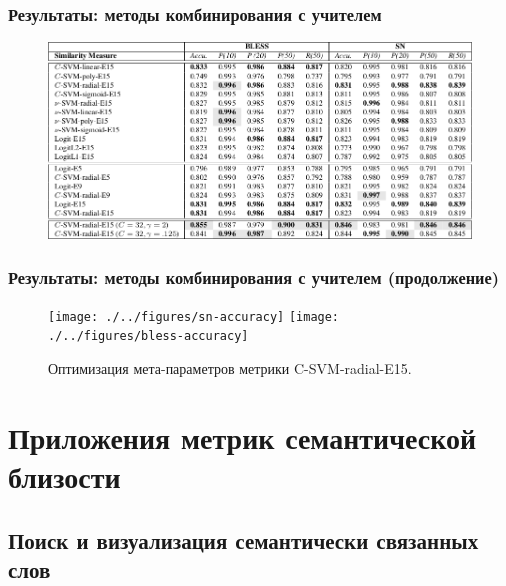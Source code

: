 \begin{frame}
\frametitle{Результаты: методы комбинирования с учителем}

    \begin{figure}
    \centering
        \includegraphics[width=1.0\textwidth]{figures/hybrid-table}
        
\end{figure}
\end{frame}


\begin{frame}
\frametitle{Результаты: методы комбинирования с учителем (продолжение)}
\begin{figure}
\centering
\texttt{[image: ./../figures/sn-accuracy]}
\texttt{[image: ./../figures/bless-accuracy]}
     
\caption{ Оптимизация мета-параметров метрики C-SVM-radial-E15.  }
\label{fig:radial-optimization}
\end{figure}
\end{frame}


\section[Приложения]{Приложения метрик семантической близости}
\subsection{Поиск и визуализация семантически связанных слов}

  



